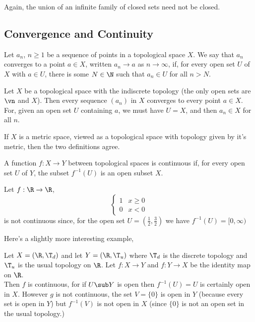 \noindent
Again, the union of an infinite family of closed sets need not be closed.

\subsection{Convergence and Continuity}
\begin{ndefi}
  Let $a_n$, $n \ge 1$ be a sequence of points in a topological space $X$. We say that $a_n$ converges to a point $a \in X$, written $a_n \to a$ as $n \to \infty$, if, for every open set $U$ of $X$ with $a \in U$, there is some $N \in \N$ such that $a_n \in U$ for all $n > N$.
\end{ndefi}

\begin{eg}
  Let $X$ be a topological space with the indiscrete topology (the only open sets are $\vn$ and $X$). Then every sequence $(a_n)$ in $X$ converges to every point $a \in X$. For, given an open set $U$ containing $a$, we must have $U = X$, and then $a_n \in X$ for all $n$.
\end{eg}

\begin{remark}
   If $X$ is a metric space, viewed as a topological space with topology given by it's metric, then the two definitions agree.
\end{remark}

\begin{ndefi}[Continuous]
  A function $f : X \to Y$ between topological spaces is continuous if, for every open set $U$ of $Y$, the subset $f^{-1}(U)$ is an open subset $X$.
\end{ndefi}

\begin{eg}
  Let $f : \R \to \R$,
  $$ \begin{cases}
    1 & x \ge 0\\
    0 & x < 0
  \end{cases} $$
  is not continuous since, for the open set $U = \left( \frac{1}{2}, \frac{3}{2} \right)$ we have $f^{-1}(U) = [0, \infty)$
\end{eg}

Here's a slightly more interesting example,
\begin{eg}
  Let $X = (\R, \T_d)$ and let $Y = (\R, \T_u)$ where $\T_d$ is the discrete topology and $\T_u$ is the usual topology on $\R$. Let $f : X \to Y$ and $f: Y \to X$ be the identity map on $\R$. \\

  Then $f$ is continuous, for if $U \sub Y$ is open then $f^{-1}(U) = U$ is certainly open in $X$. However $g$ is not continuous, the set $V = \{0\}$ is open in $Y$ (because every set is open in $Y$) but $f^{-1}(V)$ is not open in $X$ (since $\{0\}$ is not an open set in the usual topology.)
\end{eg}

